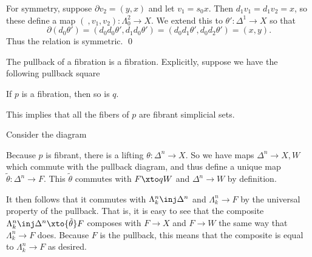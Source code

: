     For symmetry, suppose $\partial v_2=(y,x)$ and let $v_1=s_0x$.
    Then $d_1v_1=d_1v_2=x$, so these define a map $(\ ,v_1,v_2)\colon\Lambda^2_0\to X$.
    We extend this to $\theta'\colon\Delta^1\to X$ so that
    $$ \partial(d_0\theta') = (d_0d_0\theta',d_1d_0\theta') = (d_0d_1\theta',d_0d_2\theta') = (x,y) . $$
    Thus the relation is symmetric.
    \qed

\eproof

\blemm[name={fibrantfibers}]

    The pullback of a fibration is a fibration.
    Explicitly, suppose we have the following pullback square

    \centerline{}

    If $p$ is a fibration, then so is $q$.

    This implies that all the fibers of $p$ are fibrant simplicial sets.

\elemm

\bproof

    Consider the diagram

    \centerline{}

    Because $p$ is fibrant, there is a lifting $\theta\colon\Delta^n\to X$.
    So we have maps $\Delta^n\to X,W$ which commute with the pullback diagram, and thus define a unique map $\tilde\theta\colon\Delta^n\to F$.
    This $\tilde\theta$ commutes with $F\xto qW$ and $\Delta^n\to W$ by definition.

    It then follows that it commutes with $\Lambda^n_k\inj\Delta^n$ and $\Lambda^n_k\to F$ by the universal property of the pullback.
    That is, it is easy to see that the composite $\Lambda^n_k\inj\Delta^n\xto{\tilde\theta}F$ composes with $F\to X$ and $F\to W$ the same way that $\Lambda^n_k\to F$
    does.
    Because $F$ is the pullback, this means that the composite is equal to $\Lambda^n_k\to F$ as desired.

